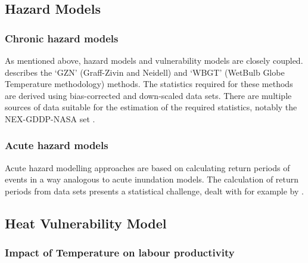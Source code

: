 \documentclass{article}
\begin{document}
\subsection{Hazard Models}

\subsubsection{Chronic hazard models}
As mentioned above, hazard models and vulnerability models are closely coupled. \cite{ZhangAndShindell:2021} describes the `GZN' (Graff-Zivin and Neidell) and `WBGT' (WetBulb Globe Temperature methodology) methods. The statistics required for these methods are derived using bias-corrected and down-scaled data sets. There are multiple sources of data suitable for the estimation of the required statistics, notably the NEX-GDDP-NASA set \cite{ThrasherEtAl:2022}.



\subsubsection{Acute hazard models}
Acute hazard modelling approaches are based on calculating return periods of events in a way analogous to acute inundation models. The calculation of return periods from data sets presents a statistical challenge, dealt with for example by \cite{MentaschiEtAl:2016}.





\subsection{Heat Vulnerability Model}

\label{SubSec:HeatVulnerabilityModel}

\subsubsection{Impact of Temperature on labour productivity}
\end{document}
